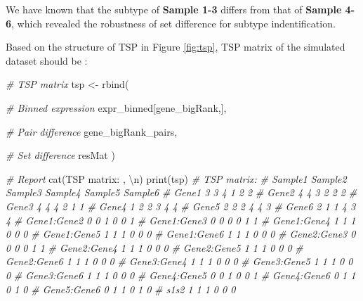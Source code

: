 \documentclass[
  12pt,
]{book}
\newenvironment{Shaded}{\begin{snugshade}}{\end{snugshade}}
\newcommand{\CommentTok}[1]{\textcolor[rgb]{0.56,0.35,0.01}{\textit{#1}}}
\newcommand{\FunctionTok}[1]{\textcolor[rgb]{0.00,0.00,0.00}{#1}}
\newcommand{\NormalTok}[1]{#1}
\newcommand{\OtherTok}[1]{\textcolor[rgb]{0.56,0.35,0.01}{#1}}
\newcommand{\SpecialCharTok}[1]{\textcolor[rgb]{0.00,0.00,0.00}{#1}}
\newcommand{\StringTok}[1]{\textcolor[rgb]{0.31,0.60,0.02}{#1}}
\begin{document}
We have known that the subtype of \textbf{Sample 1-3} differs from that of \textbf{Sample 4-6}, which revealed the robustness of set difference for subtype indentification.

Based on the structure of TSP in Figure \ref{fig:tsp}, TSP matrix of the simulated dataset should be :

\begin{Shaded}
\begin{Highlighting}[]

\CommentTok{\# TSP matrix}
\NormalTok{tsp }\OtherTok{\textless{}{-}} \FunctionTok{rbind}\NormalTok{(}
  
  \CommentTok{\# Binned expression}
\NormalTok{  expr\_binned[gene\_bigRank,],}
  
  \CommentTok{\# Pair difference}
\NormalTok{  gene\_bigRank\_pairs,}
  
  \CommentTok{\# Set difference}
\NormalTok{  resMat}
\NormalTok{)}

\CommentTok{\# Report }
\FunctionTok{cat}\NormalTok{(}\StringTok{\textquotesingle{}TSP matrix: \textquotesingle{}}\NormalTok{, }\StringTok{\textquotesingle{}}\SpecialCharTok{\textbackslash{}n}\StringTok{\textquotesingle{}}\NormalTok{)}
\FunctionTok{print}\NormalTok{(tsp)}
\CommentTok{\# TSP matrix:  }
\CommentTok{\#             Sample1 Sample2 Sample3 Sample4 Sample5 Sample6}
\CommentTok{\# Gene1             3       3       4       1       2       2}
\CommentTok{\# Gene2             4       4       3       2       2       2}
\CommentTok{\# Gene3             4       4       4       2       1       1}
\CommentTok{\# Gene4             1       2       2       3       4       4}
\CommentTok{\# Gene5             2       2       2       4       4       3}
\CommentTok{\# Gene6             2       1       1       4       3       4}
\CommentTok{\# Gene1:Gene2       0       0       1       0       0       1}
\CommentTok{\# Gene1:Gene3       0       0       0       0       1       1}
\CommentTok{\# Gene1:Gene4       1       1       1       0       0       0}
\CommentTok{\# Gene1:Gene5       1       1       1       0       0       0}
\CommentTok{\# Gene1:Gene6       1       1       1       0       0       0}
\CommentTok{\# Gene2:Gene3       0       0       0       0       1       1}
\CommentTok{\# Gene2:Gene4       1       1       1       0       0       0}
\CommentTok{\# Gene2:Gene5       1       1       1       0       0       0}
\CommentTok{\# Gene2:Gene6       1       1       1       0       0       0}
\CommentTok{\# Gene3:Gene4       1       1       1       0       0       0}
\CommentTok{\# Gene3:Gene5       1       1       1       0       0       0}
\CommentTok{\# Gene3:Gene6       1       1       1       0       0       0}
\CommentTok{\# Gene4:Gene5       0       0       1       0       0       1}
\CommentTok{\# Gene4:Gene6       0       1       1       0       1       0}
\CommentTok{\# Gene5:Gene6       0       1       1       0       1       0}
\CommentTok{\# s1s2              1       1       1       0       0       0}
\end{Highlighting}
\end{Shaded}
\end{document}
